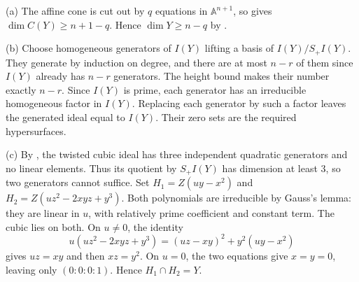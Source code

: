 (a) The affine cone is cut out by $q$ equations in $\mathbb A^{n+1}$, so  gives $\dim C(Y)\ge n+1-q$. Hence $\dim Y\ge n-q$ by .

(b) Choose homogeneous generators of $I(Y)$ lifting a basis of $I(Y)/S_+I(Y)$. They generate by induction on degree, and there are at most $n-r$ of them since $I(Y)$ already has $n-r$ generators. The height bound makes their number exactly $n-r$. Since $I(Y)$ is prime, each generator has an irreducible homogeneous factor in $I(Y)$. Replacing each generator by such a factor leaves the generated ideal equal to $I(Y)$. Their zero sets are the required hypersurfaces.

(c) By , the twisted cubic ideal has three independent quadratic generators and no linear elements. Thus its quotient by $S_+I(Y)$ has dimension at least $3$, so two generators cannot suffice. Set $H_1=Z(uy-x^2)$ and $H_2=Z(uz^2-2xyz+y^3)$. Both polynomials are irreducible by Gauss's lemma: they are linear in $u$, with relatively prime coefficient and constant term. The cubic lies on both. On $u\ne0$, the identity
\[u(uz^2-2xyz+y^3)=(uz-xy)^2+y^2(uy-x^2)\]
 gives $uz=xy$ and then $xz=y^2$. On $u=0$, the two equations give $x=y=0$, leaving only $(0:0:0:1)$. Hence $H_1\cap H_2=Y$.
